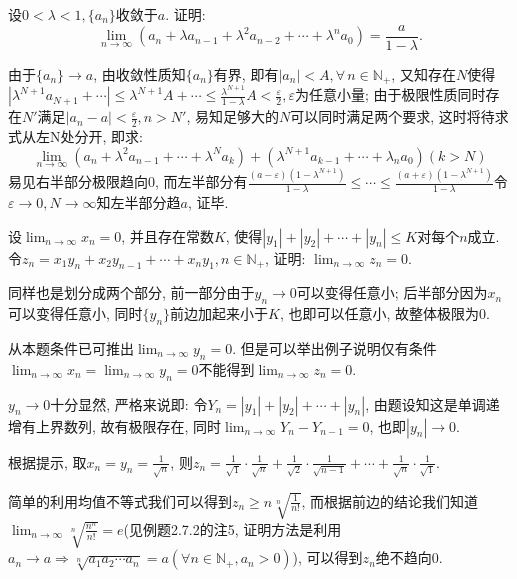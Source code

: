     \begin{exercise}
         设$0<\lambda<1,\{a_n\}$收敛于$a$. 证明:
         \[
             \lim_{n\to\infty}(a_n+\lambda a_{n-1}+{\lambda}^2 a_{n-2}+\cdots+{\lambda}^n a_0)=\frac{a}{1-\lambda}.
         \]
     \end{exercise}
     \begin{solution}
         由于$\{a_n\}\to a$, 由收敛性质知$\{a_n\}$有界, 即有$|a_n|<A, \forall\, n\in \mathbb{N}_+$, 又知存在$N$使得$|\lambda^{N+1}a_{N+1}+\cdots|\leqslant \lambda^{N+1}A+\cdots \leqslant \frac{\lambda^{N+1}}{1-\lambda}A<\frac{\varepsilon}{2},\varepsilon$为任意小量; 由于极限性质同时存在$N'$满足$|a_n-a|<\frac{\varepsilon}{2}, n>N'$, 易知足够大的$N$可以同时满足两个要求, 这时将待求式从左N处分开, 即求:
         \[
             \lim_{n\to\infty}(a_n+\lambda^2 a_{n-1}+\cdots+\lambda^N a_k)+(\lambda^{N+1}a_{k-1}+\cdots+\lambda_n a_0)(k>N)
         \]
         易见右半部分极限趋向0, 而左半部分有$\frac{(a-\varepsilon)(1-\lambda^{N+1})}{1-\lambda}\leqslant \cdots \leqslant \frac{(a+\varepsilon)(1-\lambda^{N+1})}{1-\lambda}$令$\varepsilon\to 0, N\to\infty$知左半部分趋$a$, 证毕.
     \end{solution}

     \begin{exercise}
         设$\lim_{n\to\infty}x_n=0$, 并且存在常数$K$, 使得$|y_1|+|y_2|+\cdots+|y_n|\leqslant K$对每个$n$成立. 令$z_n=x_1y_n+x_2y_{n-1}+\cdots+x_ny_1, n\in \mathbb{N}_+$, 证明: $\lim_{n\to\infty}z_n=0$.
     \end{exercise}
     \begin{solution}
         同样也是划分成两个部分, 前一部分由于$y_n\to 0$可以变得任意小; 后半部分因为$x_n$可以变得任意小, 同时$\{y_n\}$前边加起来小于$K$, 也即可以任意小, 故整体极限为0.
     \end{solution}
     \begin{note}
         从本题条件已可推出$\lim_{n\to\infty}y_n=0$. 但是可以举出例子说明仅有条件$\lim_{n\to\infty}x_n=\lim_{n\to\infty}y_n=0$不能得到$\lim_{n\to\infty}z_n=0$.
     \end{note}
     \begin{note}
         $y_n\to 0$十分显然, 严格来说即: 令$Y_n=|y_1|+|y_2|+\cdots+|y_n|$, 由题设知这是单调递增有上界数列, 故有极限存在, 同时$\lim_{n\to\infty}Y_n-Y_{n-1}=0$, 也即$|y_n|\to 0$.

         根据提示, 取$x_n=y_n=\frac{1}{\sqrt{n}}$, 则$z_n=\frac{1}{\sqrt{1}}\cdot\frac{1}{\sqrt{n}}+\frac{1}{\sqrt{2}}\cdot\frac{1}{\sqrt{n-1}}+\cdots+\frac{1}{\sqrt{n}}\cdot\frac{1}{\sqrt{1}}$.

         简单的利用均值不等式我们可以得到$z_n \geqslant n\sqrt[n]{\frac{1}{n!}}$, 而根据前边的结论我们知道$\lim_{n\to\infty}\sqrt[n]{\frac{n^n}{n!}}=e$(见例题2.7.2的注5, 证明方法是利用$a_n\to a \Rightarrow \sqrt[n]{a_1a_2\cdots a_n}=a(\forall n \in \mathbb{N}_+, a_n>0)$), 可以得到$z_n$绝不趋向0.
     \end{note}

